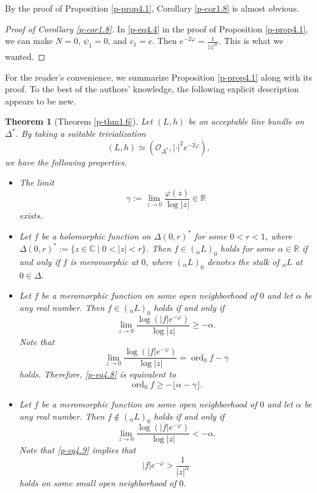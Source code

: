 \documentclass[12pt,twoside]{amsart}
\DeclareMathOperator{\ord}{ord}
\newtheorem{thm}{Theorem}[section]
\theoremstyle{definition}
\begin{document}
By the proof of Proposition \ref{p-prop4.1}, 
Corollary \ref{p-cor1.8} is almost obvious. 

\begin{proof}[Proof of Corollary \ref{p-cor1.8}]
In \eqref{p-eq4.4} in the proof of Proposition \ref{p-prop4.1}, 
we can make $N=0$, $\psi_1=0$, and $c_1=c$. 
Then $e^{-2\varphi}=\frac{1}{|z|^{2c}}$. 
This is what we wanted. 
\end{proof}

For the reader's convenience, we 
summarize Proposition \ref{p-prop4.1} 
along with its proof.
To the best of the authors' knowledge, 
the following explicit description appears to be new. 

\begin{thm}[Theorem \ref{p-thm1.6}]\label{p-thm4.4} 
Let $(L, h)$ be an acceptable line bundle on $\Delta^*$. 
By taking a suitable trivialization 
\[
(L, h)\simeq \left(\mathcal O_{\Delta^*}, |\cdot|^2e^{-2\varphi}\right), 
\] 
we have the following properties. 
\begin{itemize}
\item[(i)] The limit 
\[
\gamma :=\lim_{z\to 0} \frac{\varphi(z)}{\log |z|}\in \mathbb R
\] 
exists. 
\item[(ii)] Let $f$ be a holomorphic function on $\Delta(0, r)^*$ for some $0<r<1$, 
where $\Delta(0, r)^*:=\{z\in \mathbb C\mid 0<|z|<r\}$. 
Then $f\in ({}_\alpha L)_0$ holds for some $\alpha \in \mathbb R$ if and only if 
$f$ is meromorphic at $0$, where $({}_\alpha L)_0$ 
denotes the stalk of ${}_\alpha L$ at $0 \in \Delta$. 
\item[(iii)] Let $f$ be a meromorphic function on some open neighborhood 
of $0$ and let $\alpha$ be any real number. 
Then $f\in ({}_\alpha L)_0$ holds if and only if 
\begin{equation}\label{p-eq4.8}
\lim _{z\to 0} \frac{\log \left(|f|e^{-\varphi}\right)}{\log |z|} \geq -\alpha. 
\end{equation} 
Note that 
\[
\lim _{z\to 0} \frac{\log \left(|f|e^{-\varphi}\right)}{\log |z|}=\ord _0 f-\gamma 
\] holds. 
Therefore, \eqref{p-eq4.8} is equivalent to 
\[
\ord _0 f\geq -\lfloor \alpha -\gamma\rfloor. 
\]
\item[(iv)] Let $f$ be a meromorphic function on some open 
neighborhood of $0$ and let $\alpha$ be any real number. 
Then $f\not\in ({}_\alpha L)_0$ holds if and only if 
\begin{equation}\label{p-eq4.9}
\lim _{z\to 0} \frac{\log \left(|f|e^{-\varphi}\right)}{\log |z|}<-\alpha. 
\end{equation} 
Note that \eqref{p-eq4.9} implies that 
\[
|f|e^{-\varphi} >\frac{1}{|z|^\alpha}
\] 
holds on some small open neighborhood of $0$. 
\end{itemize}
\end{thm}
\end{document}

